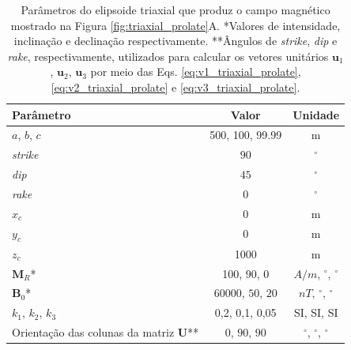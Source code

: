 \begin{table}[h!]
	\begin{center}
		\begin{tabular}{|l|c|c|}
			\hline
			\textbf{Parâmetro}  & \textbf{Valor}  & \textbf{Unidade} \\
			\hline 
			$a$, $b$, $c$  & 500, 100, 99.99 & m\\
			\hline
			\textit{strike}   & $90$ & $^{\circ}$\\
			\hline
			\textit{dip}    & $45$ & $^{\circ}$\\
			\hline
			\textit{rake}   & $0$  & $^{\circ}$\\
			\hline
			$x_c$   & 0 & m \\
			\hline          
			$y_c$   & 0  & m\\
			\hline                
			$z_c$   & 1000  & m\\
			\hline
			$\mathbf{M}_{R}$*  & 100, $90$, $0$  & $A/m$, $^{\circ}$, $^{\circ}$\\
			\hline
			$\mathbf{B}_{0}$*    & 60000, $50$, $20$ & $nT$, $^{\circ}$, $^{\circ}$\\
			\hline
			$k_{1}$, $k_{2}$, $k_{3}$   & 0,2, 0,1, 0,05  & SI, SI, SI\\
			\hline
			Orientação das colunas da matriz $\mathbf{U}$**   & $0$, $90$, $90$  & $^{\circ}$, $^{\circ}$, $^{\circ}$\\
			\hline
		\end{tabular}
		\caption{Parâmetros do elipsoide triaxial que produz o campo magnético mostrado na Figura \ref{fig:triaxial_prolate}A. *Valores de intensidade, inclinação e declinação respectivamente. **Ângulos de \textit{strike}, \textit{dip}  e \textit{rake}, respectivamente, utilizados para calcular os vetores unitários $\mathbf{u}_{1}$, $\mathbf{u}_{2}$, $\mathbf{u}_{3}$ por meio das Eqs. \ref{eq:v1_triaxial_prolate}, \ref{eq:v2_triaxial_prolate} e \ref{eq:v3_triaxial_prolate}.}
	\end{center}
	\label{tab:triaxial_prolate1}
\end{table}

\vspace{2cm}

